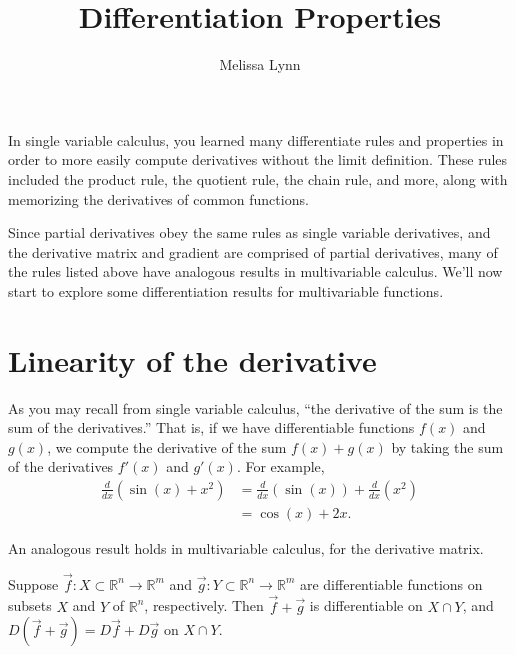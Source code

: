 \documentclass{ximera}
\title{Differentiation Properties}
\author{Melissa Lynn}
\begin{document}
\begin{abstract}
\end{abstract}
\maketitle

In single variable calculus, you learned many differentiate rules and properties in order to more easily compute derivatives without the limit definition. These rules included the product rule, the quotient rule, the chain rule, and more, along with memorizing the derivatives of common functions.

Since partial derivatives obey the same rules as single variable derivatives, and the derivative matrix and gradient are comprised of partial derivatives, many of the rules listed above have analogous results in multivariable calculus. We'll now start to explore some differentiation results for multivariable functions.

\section*{Linearity of the derivative}

As you may recall from single variable calculus, ``the derivative of the sum is the sum of the derivatives.'' That is, if we have differentiable functions $f(x)$ and $g(x)$, we compute the derivative of the sum $f(x)+g(x)$ by taking the sum of the derivatives $f'(x)$ and $g'(x)$. For example,
\begin{align*}
\frac{d}{dx}\left(\sin(x)+x^2\right) &= \frac{d}{dx}\left(\sin(x)\right) + \frac{d}{dx}\left(x^2\right)\\
&= \cos(x)+2x.
\end{align*}

An analogous result holds in multivariable calculus, for the derivative matrix.

\begin{proposition}
Suppose $\vec{f}:X\subset \mathbb{R}^n\rightarrow \mathbb{R}^m$ and $\vec{g}:Y\subset\mathbb{R}^n\rightarrow\mathbb{R}^m$ are differentiable functions on subsets $X$ and $Y$ of $\mathbb{R}^n$, respectively. Then $\vec{f}+\vec{g}$ is differentiable on $X\cap Y$, and $D(\vec{f}+\vec{g})=D\vec{f}+D\vec{g}$ on $X\cap Y$.
\end{proposition}
\end{document}
